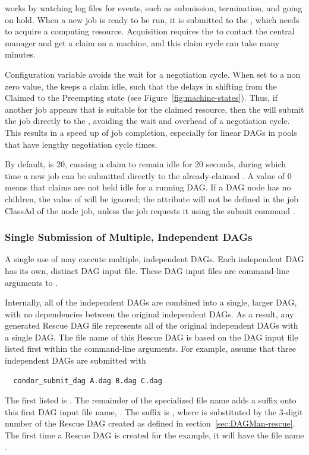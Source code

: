  works by watching log files for events, such as submission,
termination, and going on hold.
When a new job is ready to be run, it is submitted to the , 
which needs to acquire a computing resource. 
Acquisition requires the  to contact the central
manager and get a claim on a machine,
and this claim cycle can take many minutes.

Configuration variable
avoids the wait for a negotiation cycle.
When set to a non zero value, 
the  keeps a claim idle,
such that the  delays in shifting from
the Claimed to the Preempting state (see Figure~\ref{fig:machine-states}).
Thus, if another job appears that is suitable for the claimed resource,
then the  will submit the job directly to the , 
avoiding the wait and overhead of a negotiation cycle.
This results in a speed up of job completion,
especially for linear DAGs in pools that have lengthy negotiation cycle times.

By default,  is 20, 
causing a claim to remain idle for 20 seconds, 
during which time a new job can be submitted
directly to the already-claimed . 
A value of 0 means that claims are not held idle for a running DAG.
If a DAG node has no children,
the value of  will be ignored;
the  attribute will not be defined in the job ClassAd 
of the node job, unless the job requests it using the submit command
. 

\subsubsection{\label{sec:DAG-SingleSubmissionOfMultiple}Single Submission of Multiple, Independent DAGs}

A single use of  may execute multiple, independent DAGs.
Each independent DAG has its own, distinct DAG input file.
These DAG input files are command-line arguments to
.

Internally, all of the independent DAGs are combined
into a single, larger DAG, with no dependencies between
the original independent DAGs.
As a result,
any generated Rescue DAG file represents all of the original independent DAGs
with a single DAG.
The file name of this Rescue DAG is based on the DAG input file
listed first within the command-line arguments.
For example, assume that three independent DAGs are submitted with
\begin{verbatim}
  condor_submit_dag A.dag B.dag C.dag
\end{verbatim}
The first listed is .
The remainder of the specialized file name adds a suffix
onto this first DAG input file name, .
The suffix is ,
where  is substituted by the 3-digit number of the
Rescue DAG created as defined in section~\ref{sec:DAGMan-rescue}.
The first time a Rescue DAG is created for the example,
it will have the file name .

